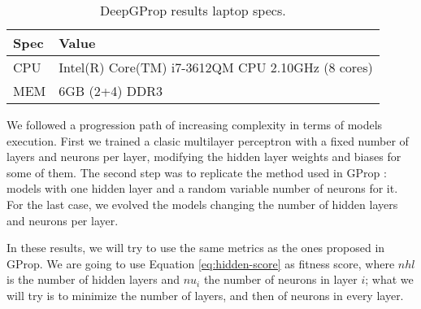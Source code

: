 \documentclass[runningheads]{llncs}
\begin{document}
\begin{table}[]
  \centering
  \caption{DeepGProp results laptop specs.}
  \label{tab:setup}
  \begin{tabular}{|l|l|}
  \hline
    Spec & Value                                             \\ \hline
    CPU  & Intel(R) Core(TM) i7-3612QM CPU 2.10GHz (8 cores) \\ \hline
    MEM  & 6GB (2+4) DDR3                                    \\ \hline
  \end{tabular}
\end{table}


We followed a progression path of increasing complexity in terms of models
execution. First we trained a clasic multilayer perceptron with a fixed number
of layers and neurons per layer, modifying the hidden layer weights and biases
for some of them. The second step was to replicate the method used in GProp
\cite{g-prop}: %
models with one hidden layer and a random variable number of
neurons for it. For the last case, we evolved the models changing the number of
hidden layers and neurons per layer.

In these results, we will try to use the same metrics as the ones
proposed in GProp. We are going to use Equation
\ref{eq:hidden-score} as fitness score, where $nhl$ is the number of
hidden layers and $nu_{i}$ the number of neurons in layer $i$; what we
will try is to minimize the number of layers, and then of neurons in
every layer.

\end{document}
